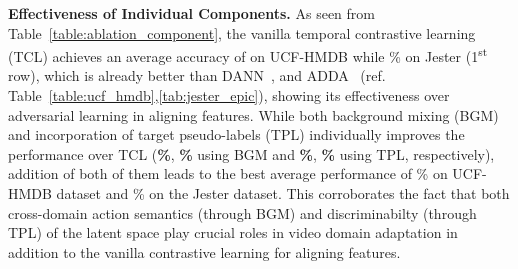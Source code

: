 \textbf{Effectiveness of Individual Components.} As seen from Table~\ref{table:ablation_component}, the vanilla temporal contrastive learning (TCL) achieves an average accuracy of  on UCF-HMDB while \% on Jester (1\textsuperscript{st} row), which is already better than DANN~\cite{ganin2016domain}, and ADDA~\cite{tzeng2017adversarial} (ref. Table~\ref{table:ucf_hmdb},\ref{tab:jester_epic}), showing its effectiveness over adversarial learning in aligning features.
While both background mixing (BGM) and incorporation of target pseudo-labels (TPL) individually improves the performance over TCL (\textbf{\%}, \textbf{\%} using BGM and \textbf{\%}, \textbf{\%} using TPL, respectively), addition of both of them leads to the best average performance of \% on UCF-HMDB dataset and \% on the Jester dataset. This corroborates the fact that both cross-domain action semantics (through BGM) and discriminabilty (through TPL) of the latent space play crucial roles in video domain adaptation in addition to the vanilla contrastive learning for aligning features. 

